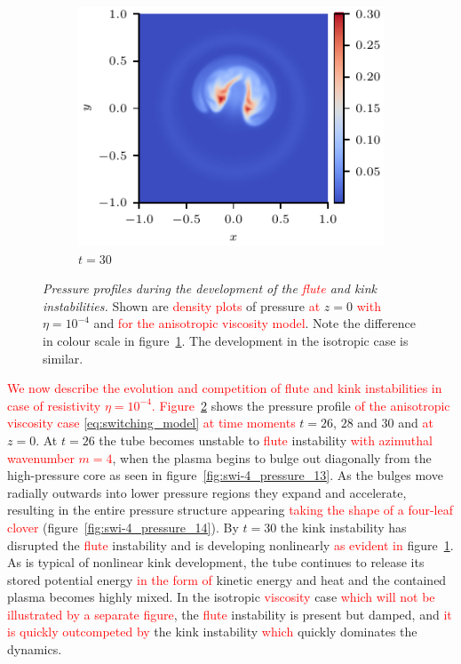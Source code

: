 \documentclass[12pt]{article}
\newcommand{\rs}[2]{\textcolor{red}{#2}}
\newcommand{\mycaption}[2]{\caption[#1]{\emph{#1} #2}}
\begin{document}
\begin{figure}[t]
\begin{subfigure}{0.32\textwidth}
      \includegraphics[width=\linewidth]{swi-4_pressure_15.pdf}
      \caption{$t=30$}
      \label{fig:swi-4_pressure_15}
    \end{subfigure}
\mycaption{Pressure profiles during the development of the
  \rs{fluting}{flute} and kink instabilities.}{Shown are
  \rs{slices}{density plots} of pressure \rs{through}{at} $z=0$
  \rs{where}{with} $\eta = 10^{-4}$ 
  and \rs{the viscosity model is \rs{switching}{anisotropic}}{for the
    anisotropic viscosity model}. Note the difference in colour scale
  in figure~\ref{fig:swi-4_pressure_15}. The development in the
  isotropic case is similar.} 
\label{fig:kink_pressure_slices-4}%
\end{figure}

\rs{}{We now describe the evolution and competition of flute and
  kink instabilities in case of resistivity $\eta=10^{-4}$.}
\rs{The}{Figure}~\ref{fig:kink_pressure_slices-4} shows the pressure profile
\rs{the viscosity model is switching for times}{of the \rs{switching}{anisotropic} viscosity case 
\eqref{eq:switching_model} at
time moments} $t=26$, $28$ and $30$ and \rs{through}{at} $z=0$. At $t=26$
the tube becomes unstable to \rs{the $m=4$}{} \rs{fluting}{flute}
instability \rs{}{with azimuthal wavenumber $m=4$}, when the
plasma begins to \rs{(slightly)}{} bulge out diagonally from the
high-pressure core as seen in figure~\ref{fig:swi-4_pressure_13}. As  
the bulges move radially outwards into lower pressure regions they
expand and accelerate, resulting in the entire pressure structure
appearing \rs{clover-shaped}{taking the shape of a four-leaf clover} (figure~\ref{fig:swi-4_pressure_14}). By
$t=30$ the kink instability has disrupted the \rs{fluting}{flute}
instability and is developing nonlinearly
\rs{}{as evident in} figure~\ref{fig:swi-4_pressure_15}. As is typical of nonlinear kink
development, the tube continues to release its stored potential energy
\rs{as}{in the form of} kinetic energy and heat and the contained plasma becomes highly
mixed. In the \rs{unseen}{} isotropic \rs{}{viscosity} case
\rs{}{which will not be illustrated by a separate figure}, the
\rs{fluting}{flute} instability is present but damped, and \rs{}{it is
  quickly outcompeted by} the kink instability \rs{}{which} quickly dominates the dynamics. 
\end{document}
